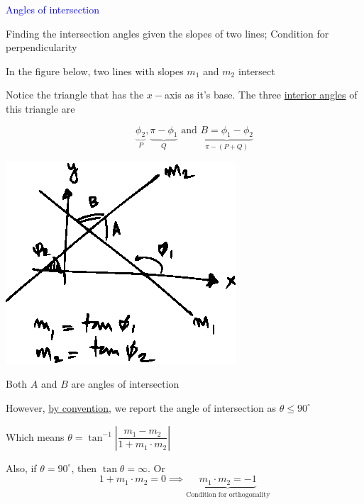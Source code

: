 \documentclass[14pt,fleqn]{extarticle}
\begin{document}
 
\begin{skill}
\begin{narrow}
\textcolor{blue}{Angles of intersection}

Finding the intersection angles given the slopes of two lines; Condition for perpendicularity 
\end{narrow}

\reason 

In the figure below, two lines with slopes $m_1$ and $m_2$ intersect\newline 

Notice the triangle that has the $x-$axis as it's base. The three \underline{interior angles} of this triangle are 

\[\qquad \underbrace{\phi_2}_P,\underbrace{\pi-\phi_1}_Q\text{ and } \underbrace{B = \phi_1-\phi_2}_{\pi - (P+Q)} \]

\begin{center}
\includegraphics[scale=1.6]{figure.eps}
\end{center}

Both $A$ and $B$ are angles of intersection\newline 

However, \underline{by convention}, we report the angle of intersection as $\theta \leq 90^\circ$ \newline 

Which means $\theta = \tan^{-1}\left\vert \dfrac{m_1 - m_2}{1+m_1\cdot m_2}\right\vert$ \newline 

Also, if $\theta=90^\circ$, then $\tan\theta = \infty$. Or 
\[ 1 + m_1\cdot m_2 = 0 \implies \underbrace{m_1\cdot m_2 = -1}_{\text{Condition for orthogonality}} \]

\end{skill} 
\end{document}
